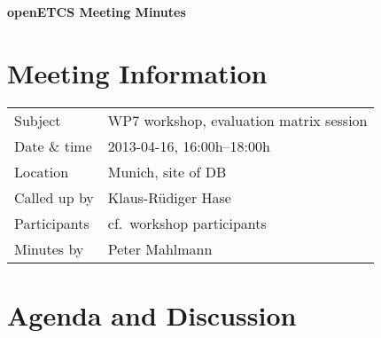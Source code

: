 \documentclass[a4paper, 11pt]{article}
\begin{document}
{\begin{center}\huge\bf openETCS Meeting Minutes\end{center}}

\section{Meeting Information}

\renewcommand{\arraystretch}{1.5}
\begin{supertabular}{m{.2\textwidth}m{.8\textwidth}}
Subject & WP7 workshop, evaluation matrix session\\
Date \& time & 2013-04-16, 16:00h--18:00h\\
Location & Munich, site of DB\\
Called up by & Klaus-R\"udiger Hase\\
Participants & cf.~workshop participants\\
Minutes by & Peter Mahlmann\\
\end{supertabular}
\renewcommand{\arraystretch}{1.0}


\section{Agenda and Discussion}
\end{document}
